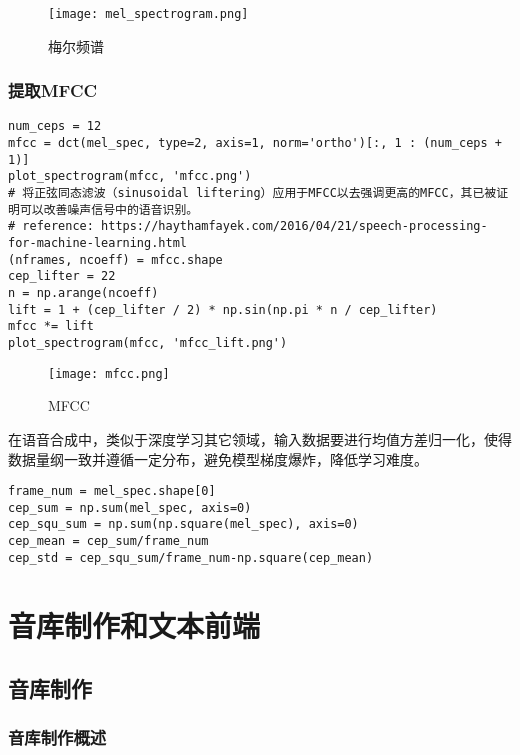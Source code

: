 \documentclass[cn,10pt,math=newtx,citestyle=gb7714-2015,bibstyle=gb7714-2015]{elegantbook}
\begin{document}
\begin{figure}[htbp]
  \centering
  \texttt{[image: mel\_spectrogram.png]}
  \caption{梅尔频谱 \label{fig:mel_spectrogram}}
\end{figure}

\subsection{提取MFCC}

\begin{lstlisting}
num_ceps = 12
mfcc = dct(mel_spec, type=2, axis=1, norm='ortho')[:, 1 : (num_ceps + 1)]
plot_spectrogram(mfcc, 'mfcc.png')
# 将正弦同态滤波（sinusoidal liftering）应用于MFCC以去强调更高的MFCC，其已被证明可以改善噪声信号中的语音识别。
# reference: https://haythamfayek.com/2016/04/21/speech-processing-for-machine-learning.html
(nframes, ncoeff) = mfcc.shape
cep_lifter = 22
n = np.arange(ncoeff)
lift = 1 + (cep_lifter / 2) * np.sin(np.pi * n / cep_lifter)
mfcc *= lift
plot_spectrogram(mfcc, 'mfcc_lift.png')
\end{lstlisting}

\begin{figure}[htbp]
  \centering
  \texttt{[image: mfcc.png]}
  \caption{MFCC \label{fig:mfcc}}
\end{figure}

在语音合成中，类似于深度学习其它领域，输入数据要进行均值方差归一化，使得数据量纲一致并遵循一定分布，避免模型梯度爆炸，降低学习难度。

\begin{lstlisting}
frame_num = mel_spec.shape[0]
cep_sum = np.sum(mel_spec, axis=0)
cep_squ_sum = np.sum(np.square(mel_spec), axis=0)
cep_mean = cep_sum/frame_num
cep_std = cep_squ_sum/frame_num-np.square(cep_mean)
\end{lstlisting}


\chapter{音库制作和文本前端}

\section{音库制作}

\subsection{音库制作概述}
\end{document}
